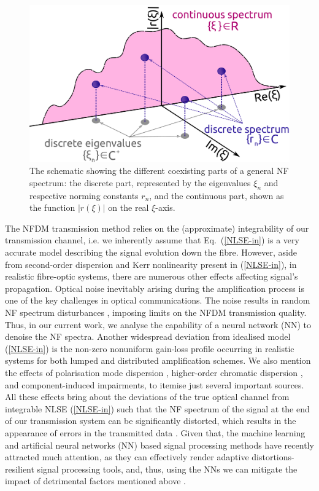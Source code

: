 \begin{figure}[tbh]
    \centering
    \includegraphics[width=0.55\linewidth]{images/nn_nft/nft_spectrum_representation_6.pdf}
    \caption{The schematic showing the different coexisting parts of a general NF spectrum: the discrete part, represented by the eigenvalues $\xi_n$ and respective norming constants $r_n$, and the continuous part, shown as the function $|r(\xi)|$ on the real $\xi$-axis. }
    \label{fig:spectrum_representation}
\end{figure}


The NFDM transmission method relies on the (approximate) integrability of our transmission channel, i.e. we inherently assume that Eq.~(\ref{NLSE-in}) is a very accurate model describing the signal evolution down the fibre. However, aside from second-order dispersion and Kerr nonlinearity present in (\ref{NLSE-in}), in realistic fibre-optic systems, there are numerous other effects affecting signal's propagation. Optical noise inevitably arising during the amplification process \cite{a12} is one of the key challenges in optical communications. The noise results in random NF spectrum disturbances \cite{dpt16,pvd20}, imposing limits on the NFDM transmission quality. Thus, in our current work, we analyse the capability of a neural network (NN) to denoise the NF spectra. Another widespread deviation from idealised model (\ref{NLSE-in}) is the non-zero nonuniform gain-loss profile occurring in realistic systems for both lumped \cite{lpt15,kplt17_2} and distributed \cite{lpr15} amplification schemes. We also mention the effects of polarisation mode dispersion \cite{ylb17,ts19}, higher-order chromatic dispersion \cite{ylb17}, and component-induced impairments, to itemise just several important sources. All these effects bring about the deviations of the true optical channel from integrable NLSE (\ref{NLSE-in}) such that the NF spectrum of the signal at the end of our transmission system can be significantly distorted, which results in the appearance of errors in the transmitted data \cite{lpphet16,lab17,ylb17}.  Given that,  the machine learning and artificial neural networks (NN) based signal processing methods have recently attracted much attention, as they can effectively render adaptive distortions-resilient signal processing tools, and, thus, using the NNs we can mitigate the impact of detrimental factors mentioned above \cite{mrn18,kfl19}.  


